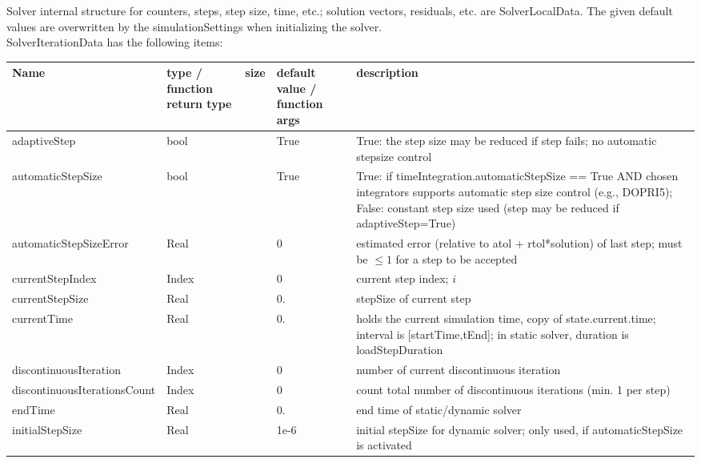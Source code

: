  \label{sec:SolverIterationData}
Solver internal structure for counters, steps, step size, time, etc.; solution vectors, residuals, etc. are SolverLocalData. The given default values are overwritten by the simulationSettings when initializing the solver.\\ 
%
SolverIterationData has the following items:
\begin{center}
  \footnotesize
  \begin{longtable}{| p{4.2cm} | p{2.5cm} | p{0.3cm} | p{3.0cm} | p{6cm} |}
    \hline
    \bf Name & \bf type / function return type & \bf size & \bf default value / function args & \bf description \\ \hline
    adaptiveStep &     bool &      &     True &     True: the step size may be reduced if step fails; no automatic stepsize control\\ \hline
    automaticStepSize &     bool &      &     True &     True: if timeIntegration.automaticStepSize == True AND chosen integrators supports automatic step size control (e.g., DOPRI5); False: constant step size used (step may be reduced if adaptiveStep=True)\\ \hline
    automaticStepSizeError &     Real &      &     0 &     estimated error (relative to atol + rtol*solution) of last step; must be $\le 1$  for a step to be accepted\\ \hline
    currentStepIndex &     Index &      &     0 &     current step index; $i$\\ \hline
    currentStepSize &     Real &      &     0. &     stepSize of current step\\ \hline
    currentTime &     Real &      &     0. &     holds the current simulation time, copy of state.current.time; interval is [startTime,tEnd]; in static solver, duration is loadStepDuration\\ \hline
    discontinuousIteration &     Index &      &     0 &     number of current discontinuous iteration\\ \hline
    discontinuousIterationsCount &     Index &      &     0 &     count total number of discontinuous iterations (min. 1 per step)\\ \hline
    endTime &     Real &      &     0. &     end time of static/dynamic solver\\ \hline
    initialStepSize &     Real &      &     1e-6 &     initial stepSize for dynamic solver; only used, if automaticStepSize is activated\\ \hline

\end{longtable}
\end{center}
